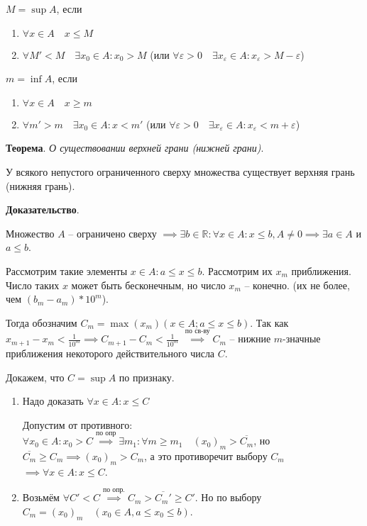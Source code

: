 \documentclass{article}
\begin{document}
$M = \sup A$, если 
\begin{enumerate}
    \item $\forall x \in A \quad x \le M$
    \item $\forall M' < M \quad \exists x_0 \in A: x_0 > M$
    (или $\forall \varepsilon > 0 \quad \exists x_\varepsilon \in A: x_\varepsilon > M - \varepsilon$)
\end{enumerate}

$m = \inf A$, если 
\begin{enumerate}
    \item $\forall x \in A \quad x \ge m$
    \item $\forall m' > m \quad \exists x_0 \in A: x < m'$
    (или $\forall \varepsilon > 0 \quad \exists x_\varepsilon \in A: x_\varepsilon < m + \varepsilon$)
\end{enumerate}

\textbf{Теорема}. \textit{О существовании верхней грани (нижней грани)}.

У всякого непустого ограниченного сверху множества существует верхняя грань (нижняя грань).

\textbf{Доказательство}.

Множество $A$ -- ограничено сверху $\implies \exists b \in \mathbb{R}: \forall x \in A:
x \le b, A \ne 0 \implies \exists a \in A$ и $a \le b$.

Рассмотрим такие элементы $x \in A: a \le x \le b$. Рассмотрим их $x_m$ приближения.
Число таких $x$ может быть бесконечным, но число $x_m$ -- конечно.
(их не более, чем $(b_m - a_m) * 10^m$). 

Тогда обозначим $C_m = \max (x_m) (x \in A; a \le x \le b)$.
Так как $x_{m+1} - x_m < \frac{1}{10^m} \implies C_{m+1} - C_m < \frac{1}{10^m}$
$\stackrel{\text{по св-ву}}{\implies} C_m$ -- нижние $m$-значные приближения некоторого 
действительного числа $C$.

Докажем, что $C = \sup A$ по признаку.
\begin{enumerate}
    \item Надо доказать $\forall x \in A: x \le C$
    
    Допустим от противного: $\forall x_0 \in A: x_0 > C \stackrel{\text{по опр}}{\implies}
    \exists m_1: \forall m \ge m_1 \quad (x_0)_m > \overline{C_m}$, но
    $\overline{C_m} \ge C_m \implies (x_0)_m > C_m$, а это противоречит выбору $C_m$
    $\implies \forall x \in A: x \le C$.

    \item Возьмём $\forall C' < C \stackrel{\text{по опр.}}{\implies} C_m > \overline{C_m'} \ge C'$.
    Но по выбору $C_m = (x_0)_m \quad (x_0 \in A, a \le x_0 \le b)$.
\end{enumerate}
\end{document}
